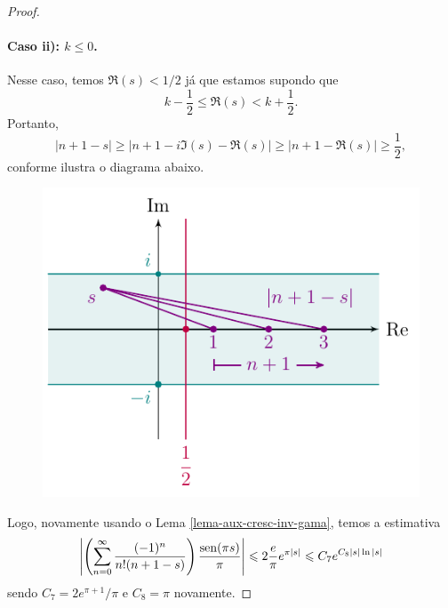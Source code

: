 \begin{proof}
        \paragraph{Caso ii): $k\leq 0$.} Nesse caso, temos $\Re(s) < 1/2$ já que estamos
        supondo que 
        \[
        k - \frac{1}{2} \leq \Re(s) < k + \frac{1}{2}.
        \]
        Portanto,
        \[
        |n+1-s| \geq |n+1 - i\Im(s) - \Re(s)| \geq |n+1 - \Re(s)| \geq \frac{1}{2},
        \]
        conforme ilustra o diagrama abaixo. 
        \begin{figure}[H]\centering
            \includegraphics{Figuras/K<=0.pdf}
        \end{figure}
        Logo, novamente usando o Lema \ref{lema-aux-cresc-inv-gama}, temos a estimativa
        \[
        \left|\left(\sum_{n=0}^{\infty} \frac{(-1)^n}{n!(n+1-s)}\right)\frac{\operatorname{sen}(\pi s)}{\pi}\right|
        \leqslant 2\frac{e}{\pi} e^{\pi |s|} 
        \leqslant C_7 e^{C_8 |s|\ln|s|}
        \]
        sendo $C_7 = 2e^{\pi + 1}/\pi$ e $C_8 = \pi$ novamente.
        

\end{proof}
